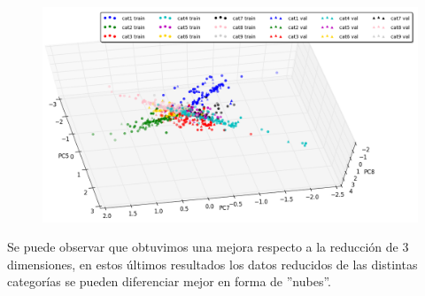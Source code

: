 \begin{figure}[ht!]
	\centering
	\includegraphics[width=0.85\linewidth]{img/parte1-vista3d-sanger-9dim3.png}

\end{figure}



Se puede observar que obtuvimos una mejora respecto a la reducción de 3 dimensiones, en estos últimos resultados los datos reducidos de las distintas categorías se pueden diferenciar mejor en forma de ''nubes''.